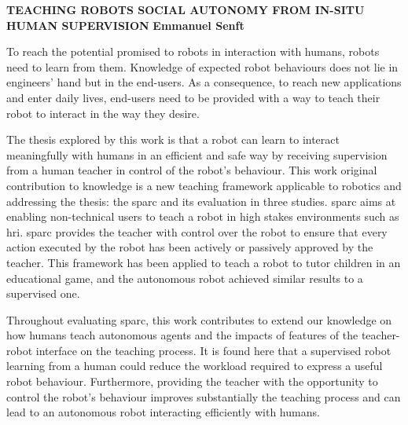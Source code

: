 \textbf{TEACHING ROBOTS SOCIAL AUTONOMY FROM IN-SITU HUMAN SUPERVISION}\newline
\textbf{Emmanuel Senft}

To reach the potential promised to robots in interaction with humans, robots need to learn from them. Knowledge of expected robot behaviours does not lie in engineers' hand but in the end-users. As a consequence, to reach new applications and enter daily lives, end-users need to be provided with a way to teach their robot to interact in the way they desire.

The thesis explored by this work is that a robot can learn to interact meaningfully with humans in an efficient and safe way by receiving supervision from a human teacher in control of the robot's behaviour. This work original contribution to knowledge is a new teaching framework applicable to robotics and addressing the thesis: the \gls{sparc} and its evaluation in three studies. \gls{sparc} aims at enabling non-technical users to teach a robot in high stakes environments such as \gls{hri}. \gls{sparc} provides the teacher with control over the robot to ensure that every action executed by the robot has been actively or passively approved by the teacher. This framework has been applied to teach a robot to tutor children in an educational game, and the autonomous robot achieved similar results to a supervised one.

Throughout evaluating \gls{sparc}, this work contributes to extend our knowledge on how humans teach autonomous agents and the impacts of features of the teacher-robot interface on the teaching process. It is found here that a supervised robot learning from a human could reduce the workload required to express a useful robot behaviour. Furthermore, providing the teacher with the opportunity to control the robot's behaviour improves substantially the teaching process and can lead to an autonomous robot interacting efficiently with humans.





